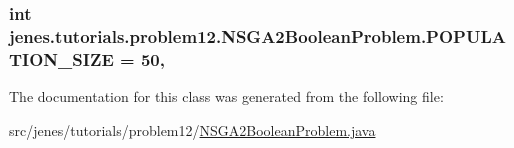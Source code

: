 \hypertarget{classjenes_1_1tutorials_1_1problem12_1_1_n_s_g_a2_boolean_problem_a61245a05aa3bdc3af9abe06303ed60e9}{
\subsubsection[{P\-O\-P\-U\-L\-A\-T\-I\-O\-N\-\_\-\-S\-I\-Z\-E}]{\setlength{\rightskip}{0pt plus 5cm}int jenes.\-tutorials.\-problem12.\-N\-S\-G\-A2\-Boolean\-Problem.\-P\-O\-P\-U\-L\-A\-T\-I\-O\-N\-\_\-\-S\-I\-Z\-E = 50\hspace{0.3cm}{\ttfamily [static]}, {\ttfamily [private]}}}\label{classjenes_1_1tutorials_1_1problem12_1_1_n_s_g_a2_boolean_problem_a61245a05aa3bdc3af9abe06303ed60e9}


The documentation for this class was generated from the following file\-:\begin{DoxyCompactItemize}
\item 
src/jenes/tutorials/problem12/\hyperlink{_n_s_g_a2_boolean_problem_8java}{N\-S\-G\-A2\-Boolean\-Problem.\-java}\end{DoxyCompactItemize}
